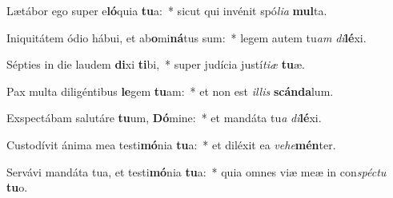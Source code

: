 \item Lætábor ego super e\textbf{ló}quia \textbf{tu}a:~* sicut qui invénit spó\textit{li}\textit{a} \textbf{mul}ta.
\item Iniquitátem ódio hábui, et ab\textbf{o}mi\textbf{ná}tus sum:~* legem autem tu\textit{am} \textit{di}\textbf{lé}xi.
\item Sépties in die laudem \textbf{di}xi \textbf{ti}bi,~* super judícia justí\textit{ti}\textit{æ} \textbf{tu}æ.
\item Pax multa diligéntibus \textbf{le}gem \textbf{tu}am:~* et non est \textit{il}\textit{lis} \textbf{scán}\textbf{da}lum.
\item Exspectábam salutáre \textbf{tu}um, \textbf{Dó}mine:~* et mandáta tu\textit{a} \textit{di}\textbf{lé}xi.
\item Custodívit ánima mea testi\textbf{mó}nia \textbf{tu}a:~* et diléxit ea \textit{ve}\textit{he}\textbf{mén}ter.
\item Servávi mandáta tua, et testi\textbf{mó}nia \textbf{tu}a:~* quia omnes viæ meæ in con\textit{spéc}\textit{tu} \textbf{tu}o.
